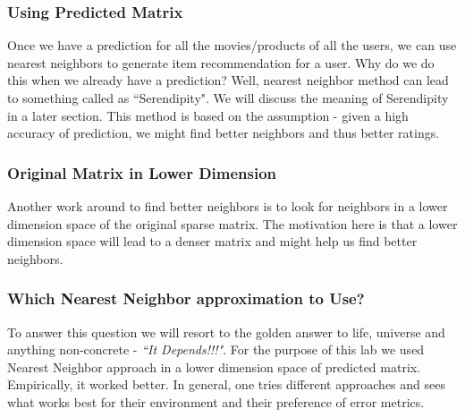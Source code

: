 \begin{enumerate}
  \subsubsection{Using Predicted Matrix}
  Once we have a prediction for all the movies/products of all the users, we can use nearest neighbors to generate item recommendation for a user. Why do we do this when we already have a prediction? Well, nearest neighbor method can lead to something called as ``Serendipity". We will discuss the meaning of Serendipity in a later section. This method is based on the assumption - given a high accuracy of prediction, we might find better neighbors and thus better ratings.
  \subsubsection{Original Matrix in Lower Dimension}
  Another work around to find better neighbors is to look for neighbors in a lower dimension space of the original sparse matrix. The motivation here is that a lower dimension space will lead to a denser matrix and might help us find better neighbors.
  \subsubsection{Which Nearest Neighbor approximation to Use?}
  To answer this question we will resort to the golden answer to life, universe and anything non-concrete - \textit{``It Depends!!!"}. For the purpose of this lab we used Nearest Neighbor approach in a lower dimension space of predicted matrix. Empirically, it worked better. In general, one tries different approaches and sees what works best for their environment and their preference of error metrics.

\end{enumerate}
